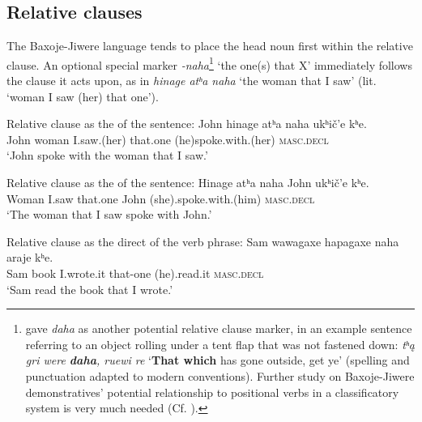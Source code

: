 \documentclass[output=paper]{LSP/langsci}
\begin{document}
\subsection{Relative clauses}  
The Baxoje-Jiwere language tends to place the head noun first within the relative clause.  An optional special marker \textit{-naha}\footnote{\citet{DorseyNDChiwere} gave \textit{daha} as another potential relative clause marker, in an example sentence referring to an object rolling under a tent flap that was not fastened down: \textit{tʰ\k{a} gri were \textbf{daha}, ruewi re} `\textbf{That which} has gone outside, get ye' (spelling and punctuation adapted to modern conventions). Further study on Baxoje-Jiwere demonstratives' potential relationship to positional verbs in a classificatory system is very much needed (Cf. \citealt[3]{Rankin2005b}).}  `the one(s) that X' immediately follows the clause it acts upon, as in \textit{hinage atʰa naha} `the woman that I saw' (lit. `woman I saw (her) that one').   

\begin{exe}
\ex
\begin{xlist}
\ex {}Relative clause as the  of the sentence:
\gll John hinage  atʰa            naha           ukʰi\v{c}'e      kʰe.	 \\				
John woman I.saw.(her) that.one (he)spoke.with.(her) \textsc{masc.decl}	 \\
\trans `John spoke with the woman that I saw.'

\ex {}Relative clause as the  of the sentence:
\gll Hinage    atʰa    naha     John          ukʰi\v{c}'e     kʰe. \\
	Woman   I.saw that.one  John (she).spoke.with.(him) \textsc{masc.decl} \\
\trans `The woman that I saw spoke with John.'

\ex {}Relative clause as the direct  of the verb phrase:
\gll Sam wawagaxe hapagaxe    naha           araje       kʰe.	\\				
Sam  book         I.wrote.it   that-one   (he).read.it   \textsc{masc.decl}	\\	
\trans `Sam read the book that I wrote.'
\end{xlist}
\end{exe}
\end{document}
